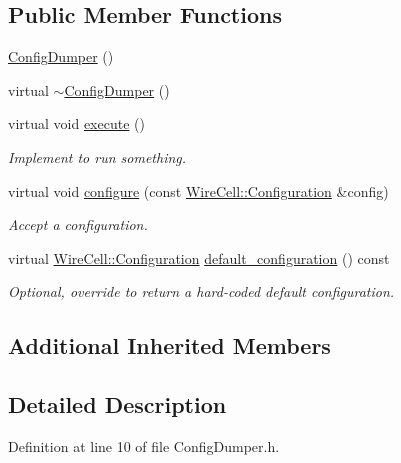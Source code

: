 \subsection*{Public Member Functions}
\begin{DoxyCompactItemize}
\item 
\hyperlink{class_wire_cell_apps_1_1_config_dumper_ac205e87c5bb5aa20c99ff411c9811a91}{Config\+Dumper} ()
\item 
virtual \hyperlink{class_wire_cell_apps_1_1_config_dumper_a1cefe0eb1cae39c0093ed6457fbed57f}{$\sim$\+Config\+Dumper} ()
\item 
virtual void \hyperlink{class_wire_cell_apps_1_1_config_dumper_abed84a041f6b72edd82854534667da56}{execute} ()
\begin{DoxyCompactList}\small\item\em Implement to run something. \end{DoxyCompactList}\item 
virtual void \hyperlink{class_wire_cell_apps_1_1_config_dumper_a2221e49099b3f24792cf73d4894b4ebf}{configure} (const \hyperlink{namespace_wire_cell_a9f705541fc1d46c608b3d32c182333ee}{Wire\+Cell\+::\+Configuration} \&config)
\begin{DoxyCompactList}\small\item\em Accept a configuration. \end{DoxyCompactList}\item 
virtual \hyperlink{namespace_wire_cell_a9f705541fc1d46c608b3d32c182333ee}{Wire\+Cell\+::\+Configuration} \hyperlink{class_wire_cell_apps_1_1_config_dumper_ad35cbc138044fd7a491402c54b0b9e50}{default\+\_\+configuration} () const
\begin{DoxyCompactList}\small\item\em Optional, override to return a hard-\/coded default configuration. \end{DoxyCompactList}\end{DoxyCompactItemize}
\subsection*{Additional Inherited Members}


\subsection{Detailed Description}


Definition at line 10 of file Config\+Dumper.\+h.



